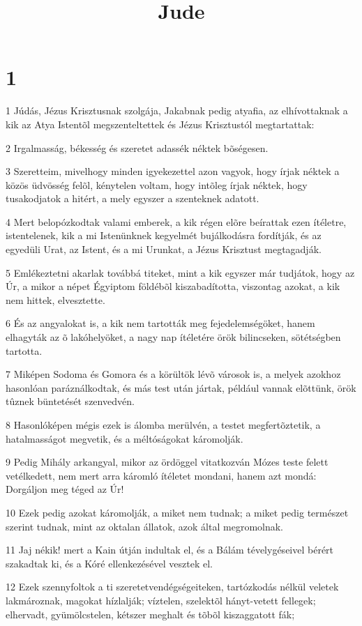 

\title{Jude}


\chapter{1}

\par 1 Júdás, Jézus Krisztusnak szolgája, Jakabnak pedig atyafia, az elhívottaknak a kik az Atya Istentõl megszenteltettek és Jézus Krisztustól megtartattak:
\par 2 Irgalmasság, békesség és szeretet adassék néktek bõségesen.
\par 3 Szeretteim, mivelhogy minden igyekezettel azon vagyok, hogy írjak néktek a közös üdvösség felõl, kénytelen voltam, hogy intõleg írjak néktek, hogy tusakodjatok a hitért, a mely egyszer a szenteknek adatott.
\par 4 Mert belopózkodtak valami emberek, a kik régen elõre beírattak ezen ítéletre, istentelenek, kik a mi Istenünknek kegyelmét bujálkodásra fordítják, és az egyedüli Urat, az Istent, és a mi Urunkat, a Jézus Krisztust megtagadják.
\par 5 Emlékeztetni akarlak továbbá titeket, mint a kik egyszer már tudjátok, hogy az Úr, a mikor a népet Égyiptom földébõl kiszabadította, viszontag azokat, a kik nem hittek, elvesztette.
\par 6 És az angyalokat is, a kik nem tartották meg fejedelemségöket, hanem elhagyták az õ lakóhelyöket, a nagy nap ítéletére örök bilincseken, sötétségben tartotta.
\par 7 Miképen Sodoma és Gomora és a körültök lévõ városok is, a melyek azokhoz hasonlóan paráználkodtak, és más test után jártak, például vannak elõttünk, örök tûznek büntetését szenvedvén.
\par 8 Hasonlóképen mégis ezek is álomba merülvén, a testet megfertõztetik, a hatalmasságot megvetik, és a méltóságokat káromolják.
\par 9 Pedig Mihály arkangyal, mikor az ördöggel vitatkozván  Mózes teste felett vetélkedett, nem mert arra káromló ítéletet mondani, hanem azt mondá: Dorgáljon meg téged az Úr!
\par 10 Ezek pedig azokat káromolják, a miket nem tudnak; a miket pedig természet szerint tudnak, mint az oktalan állatok, azok által megromolnak.
\par 11 Jaj nékik! mert a Kain útján indultak el, és  a Bálám tévelygéseivel bérért szakadtak ki, és a Kóré ellenkezésével vesztek el.
\par 12 Ezek szennyfoltok a ti szeretetvendégségeiteken, tartózkodás nélkül veletek lakmároznak, magokat hízlalják; víztelen, szelektõl hányt-vetett fellegek; elhervadt, gyümölcstelen, kétszer meghalt és tõbõl kiszaggatott fák;
